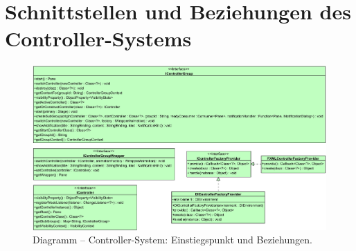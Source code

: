 \chapter{Schnittstellen und Beziehungen des Controller-Systems}
\label{appendix:controller_system}
\begin{figure}[H]
	\centering
	\includegraphics[angle=90,height=\textheight-2.2cm]{Abbildungen/Controller-System-Full.png}
	\caption*{Diagramm -- Controller-System: Einstiegspunkt und Beziehungen.}
\end{figure}
